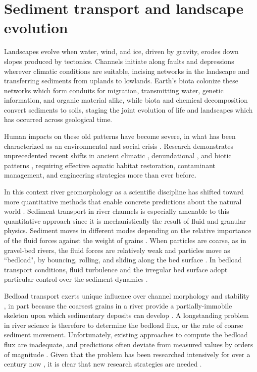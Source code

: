 
\chapter{Sediment transport and landscape evolution}
\label{ch:Introduction}

Landscapes evolve when water, wind, and ice, driven by gravity, erodes down slopes produced by tectonics.
Channels initiate along faults and depressions wherever climatic conditions are suitable, incising networks in the landscape and transferring sediments from uplands to lowlands.
Earth's biota colonize these networks which form conduits for migration, transmitting water, genetic information, and organic material alike, while biota and chemical decomposition convert sediments to soils, staging the joint evolution of life and landscapes which has occurred across geological time.

Human impacts on these old patterns have become severe, in what has been characterized as an environmental and social crisis \citep{Slaymaker2021}.
Research demonstrates unprecedented recent shifts in ancient climatic \citep{Sivan2004,Slater2021}, denundational \citep{Hooke2000,Szabo2010}, and biotic patterns \citep{Walther2002,Willis2009}, requiring effective aquatic habitat restoration, contaminant management, and engineering strategies more than ever before.

In this context river geomorphology as a scientific discipline has shifted toward more quantitative methods that enable concrete predictions about the natural world \citep{Church2005,Church2010}.
Sediment transport in river channels is especially amenable to this quantitative approach since it is mechanistically the result of fluid and granular physics.
Sediment moves in different modes depending on the relative importance of the fluid forces against the weight of grains \citep{Bagnold1956}.
When particles are coarse, as in gravel-bed rivers, the fluid forces are relatively weak and particles move as ``bedload", by bouncing, rolling, and sliding along the bed surface \citep{Kalinske1947}. In bedload transport conditions, fluid turbulence and the irregular bed surface adopt particular control over the sediment dynamics \citep{Ferreira2015}.

Bedload transport exerts unique influence over channel morphology and stability \citep{Church2006,Recking2016}, in part because the coarsest grains in a river provide a partially-immobile skeleton upon which sedimentary deposits can develop \citep{Hassan2008, Eaton2020}.
A longstanding problem in river science is therefore to determine the bedload flux, or the rate of coarse sediment movement.
Unfortunately, existing approaches to compute the bedload flux are inadequate, and predictions often deviate from measured values by orders of magnitude \citep{Gomez1989, Barry2004, Bathurst2007a, Recking2012}.
Given that the problem has been researched intensively for over a century now \citep{Gilbert1914}, it is clear that new research strategies are needed \citep{Ancey2020a,Ancey2020}.

